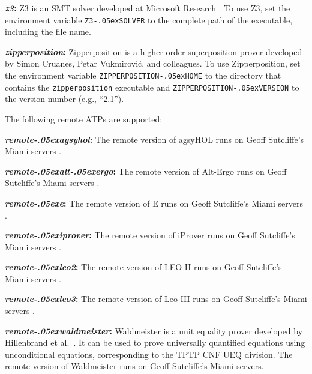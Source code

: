 \documentclass[a4paper,12pt]{article}
\renewcommand\_{\hbox{\textunderscore\kern-.05ex}}
\begin{document}
\begin{enum}
\begin{sloppy}
\begin{enum}
\item[\labelitemi] \textbf{\textit{z3}:} Z3 is an SMT solver developed at
Microsoft Research \cite{de-moura-2008}. To use Z3, set the environment variable
\texttt{Z3\_SOLVER} to the complete path of the executable, including the
file name.

\item[\labelitemi] \textbf{\textit{zipperposition}:} Zipperposition
\cite{cruanes-2014} is a higher-order superposition prover developed by Simon
Cruanes, Petar Vukmirovi\'c, and colleagues. To use Zipperposition, set the
environment variable \texttt{ZIPPERPOSITION\_HOME} to the directory that
contains the \texttt{zipperposition} executable and
\texttt{ZIPPERPOSITION\_VERSION} to the version number (e.g., ``2.1'').
\end{enum}

\end{sloppy}

The following remote ATPs are supported:

\begin{enum}
\item[\labelitemi] \textbf{\textit{remote\_agsyhol}:} The remote version of
agsyHOL runs on Geoff Sutcliffe's Miami servers \cite{sutcliffe-2000}.

\item[\labelitemi] \textbf{\textit{remote\_alt\_ergo}:} The remote version of
Alt-Ergo runs on Geoff Sutcliffe's Miami servers \cite{sutcliffe-2000}.

\item[\labelitemi] \textbf{\textit{remote\_e}:} The remote version of E runs
on Geoff Sutcliffe's Miami servers \cite{sutcliffe-2000}.

\item[\labelitemi] \textbf{\textit{remote\_iprover}:} The
remote version of iProver runs on Geoff Sutcliffe's Miami servers
\cite{sutcliffe-2000}.

\item[\labelitemi] \textbf{\textit{remote\_leo2}:} The remote version of LEO-II
runs on Geoff Sutcliffe's Miami servers \cite{sutcliffe-2000}.

\item[\labelitemi] \textbf{\textit{remote\_leo3}:} The remote version of Leo-III
runs on Geoff Sutcliffe's Miami servers \cite{sutcliffe-2000}.

\item[\labelitemi] \textbf{\textit{remote\_waldmeister}:} Waldmeister is a unit
equality prover developed by Hillenbrand et al.\ \cite{waldmeister}. It can be
used to prove universally quantified equations using unconditional equations,
corresponding to the TPTP CNF UEQ division. The remote version of Waldmeister
runs on Geoff Sutcliffe's Miami servers.


\end{enum}
\end{enum}
\end{document}
